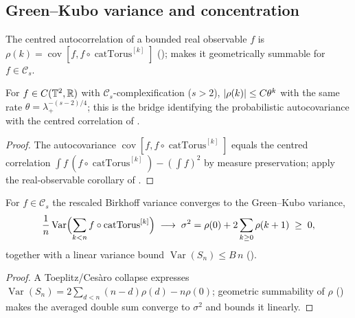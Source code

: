 \subsection{Green--Kubo variance and concentration}

The centred autocorrelation of a bounded real observable \(f\) is
\(\rho(k) = \operatorname{cov}[f, f\circ\operatorname{catTorus}^{[k]}]\)
();  makes it geometrically summable
for \(f\in\mathcal C_s\).

\begin{theorem}\label{catAutoCorr_decay}
  \leanok
  For \(f\in C(\mathbb{T}^2,\mathbb{R})\) with \(\mathcal C_s\)-complexification (\(s > 2\)),
  \(\left\lvert \rho(k) \right\rvert\le C\theta^{k}\) with the same rate \(\theta = \lambda_+^{-(s-2)/4}\); this is the
  bridge identifying the probabilistic autocovariance with the centred correlation of
  .
\end{theorem}
\begin{proof}\leanok
  The autocovariance \(\operatorname{cov}[f, f\circ\operatorname{catTorus}^{[k]}]\) equals the centred
  correlation \(\int f\,(f\circ\operatorname{catTorus}^{[k]}) - (\int f)^2\) by measure preservation;
  apply the real-observable corollary of .
\end{proof}

\begin{theorem}\label{catGreenKubo_fourierDecay}
  \leanok
  For \(f\in\mathcal C_s\) the rescaled Birkhoff variance converges to the Green--Kubo variance,
  \[
    \frac1n\operatorname{Var}\Bigl(\sum_{k<n} f\circ\operatorname{catTorus}^{[k]}\Bigr)
      \;\longrightarrow\; \sigma^2 = \rho(0) + 2\sum_{k\ge 0}\rho(k+1) \;\ge\; 0,
  \]
  together with a linear variance bound \(\operatorname{Var}(S_n)\le B\,n\)
  ().
\end{theorem}
\begin{proof}\leanok
  A Toeplitz/Ces\`aro collapse expresses \(\operatorname{Var}(S_n) = 2\sum_{d<n}(n-d)\rho(d) -
  n\rho(0)\); geometric summability of \(\rho\) () makes the averaged
  double sum converge to \(\sigma^2\) and bounds it linearly.
\end{proof}

